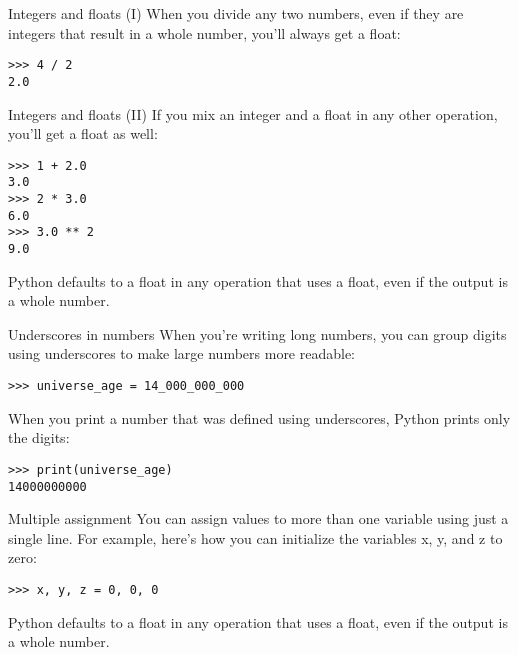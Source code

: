 \documentclass[aspectratio=169]{beamer}
\begin{document}
\begin{frame}[fragile]{Integers and floats (I)}
    When you divide any two numbers, even if they are integers that result in a whole number, you’ll always get a float:
    \vspace{10pt}
    \begin{verbatim}
>>> 4 / 2
2.0
    \end{verbatim}
\end{frame}


\begin{frame}[fragile]{Integers and floats (II)}
    If you mix an integer and a float in any other operation, you’ll get a float as well:
    \vspace{10pt}
    \begin{verbatim}
>>> 1 + 2.0
3.0
>>> 2 * 3.0
6.0
>>> 3.0 ** 2
9.0
    \end{verbatim}
    \vspace{15pt}
    Python defaults to a float in any operation that uses a float, even if the output is a whole number.
\end{frame}


\begin{frame}[fragile]{Underscores in numbers}
    When you’re writing long numbers, you can group digits using underscores to make large numbers more readable:
    \vspace{10pt}
    \begin{verbatim}
>>> universe_age = 14_000_000_000
    \end{verbatim}
    \vspace{10pt}
    When you print a number that was defined using underscores, Python prints only the digits:
    \vspace{10pt}
    \begin{verbatim}
>>> print(universe_age)
14000000000
    \end{verbatim}
\end{frame}


\begin{frame}[fragile]{Multiple assignment}
    You can assign values to more than one variable using just a single line.
    For example, here’s how you can initialize the variables x, y, and z to zero:
    \vspace{10pt}
    \begin{verbatim}
>>> x, y, z = 0, 0, 0
    \end{verbatim}
    \vspace{15pt}
    Python defaults to a float in any operation that uses a float, even if the output is a whole number.
\end{frame}
\end{document}
